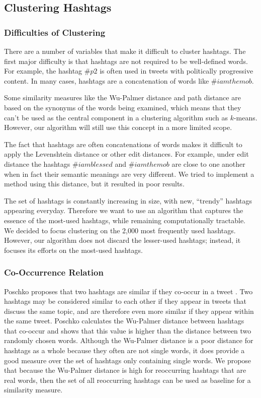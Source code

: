 \subsection{Clustering Hashtags}
\subsubsection{Difficulties of Clustering}
There are a number of variables that make it difficult to cluster hashtags. The first major difficulty is that hashtags are not required to be well-defined words. For example, the hashtag $\#p2$ is often used in tweets with politically progressive content. In many cases, hashtags are a concatenation of words like $\#iamthemob$.  

Some similarity measures like the Wu-Palmer distance \cite{Wu1994} and path distance are based on the synonyms of the words being examined, which means that they can't be used as the central component in a clustering algorithm such as $k$-means. However, our algorithm will still use this concept in a more limited scope.

The fact that hashtags are often concatenations of words makes it difficult to apply the Levenshtein distance \cite{Levenshtein1966} or other edit distances. For example, under edit distance the hashtags $\#iamblessed$ and $\#iamthemob$ are close to one another when in fact their semantic meanings are very different. We tried to implement a method using this distance, but it resulted in poor results.

The set of hashtags is constantly increasing in size, with new, ``trendy'' hashtags appearing everyday. Therefore we want to use an algorithm that captures the essence of the most-used hashtags, while remaining computationally tractable. We decided to focus clustering on the 2,000 most frequently used hashtags. However, our algorithm does not discard the lesser-used hashtags; instead, it focuses its efforts on the most-used hashtags.

\subsubsection{Co-Occurrence Relation}
Poschko proposes that two hashtags are similar if they co-occur in a tweet \cite{Poschko2011}. Two hashtags may be considered similar to each other if they appear in tweets that discuss the same topic, and are therefore even more similar if they appear within the same tweet. Poschko calculates the Wu-Palmer distance between hashtags that co-occur and shows that this value is higher than the distance between two randomly chosen words. Although the Wu-Palmer distance is a poor distance for hashtags as a whole because they often are not single words, it does provide a good measure over the set of hashtags only containing single words. We propose that because the Wu-Palmer distance is high for reoccurring hashtags that are real words, then the set of all reoccurring hashtags can be used as baseline for a similarity measure.

